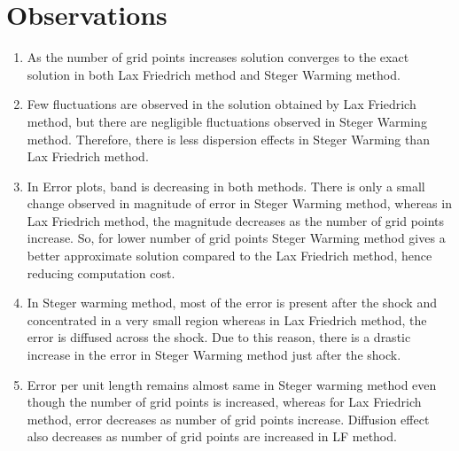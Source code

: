 \documentclass{article}
\begin{document}
\section*{Observations}

\begin{enumerate}
\item As the number of grid points increases solution converges to the exact solution in both Lax Friedrich method and Steger Warming method.

\item Few fluctuations are observed in the solution obtained by Lax Friedrich method, but there are negligible fluctuations observed in Steger Warming method. Therefore, there is less dispersion effects in Steger Warming than Lax Friedrich method.

\item In Error plots, band is decreasing in both methods. There is only a small change observed in magnitude of error in Steger Warming method, whereas in Lax Friedrich method, the magnitude decreases as the number of grid points increase. So, for lower number of grid points Steger Warming method gives a better approximate solution compared to the Lax Friedrich method, hence reducing computation cost.

\item In Steger warming method, most of the error is present after the shock and concentrated in a very small region whereas in Lax Friedrich method, the error is diffused across the shock. Due to this reason, there is a drastic increase in the error in Steger Warming method just after the shock. 
\item Error per unit length remains almost same in Steger warming method even though the number of grid points is increased, whereas for Lax Friedrich method, error decreases as number of grid points increase. Diffusion effect also decreases as number of grid points are increased in LF method.

\end{enumerate}
\end{document}
